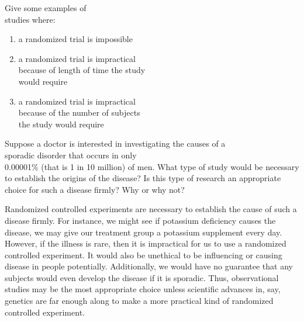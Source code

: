\documentclass[11pt]{book}\usepackage[]{graphicx}\usepackage[]{color}
\begin{document}
\begin{exercises}
  \begin{exercise} %

Give some examples of \\ studies where:

\begin{enumerate}
\item a randomized trial is impossible
\item a randomized trial is impractical \\ because of length of time the study      \\ would require
\item a randomized trial is impractical \\ because of the number of subjects \\ the study would require
\end{enumerate}


	\end{exercise}

  \begin{exercise} %

Suppose a doctor is interested in investigating the causes of a \\ sporadic disorder that occurs in only \\ 0.00001\% (that is 1 in 10 million) of men.  What type of study would be necessary to establish the origins of the disease?  Is this type of research an appropriate choice for such a disease firmly?  Why or why not?

	\end{exercise}
	\begin{solution}  %

Randomized controlled experiments are necessary to establish the cause of such a disease firmly. For instance, we might see if potassium deficiency causes the disease, we may give our treatment group a potassium supplement every day. However, if the illness is rare, then it is impractical for us to use a randomized controlled experiment.  It would also be unethical to be influencing or causing disease in people potentially.  Additionally, we would have no guarantee that any subjects would even develop the disease if it is sporadic. Thus, observational studies may be the most appropriate choice unless scientific advances in, say, genetics are far enough along to make a more practical kind of randomized controlled experiment.


\end{solution}
\end{exercises}
\end{document}
